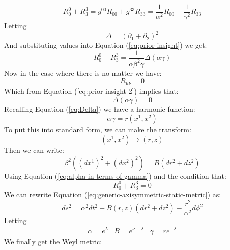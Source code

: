 \documentclass{article}
\begin{document}
\begin{equation}
R^{0}_{0}+R^{3}_{3}=g^{00}R_{00}+g^{33}R_{33}=\frac{1}{\alpha^{2}}R_{00}-\frac{1}{\gamma^{2}}R_{33}\label{eq:prior-insight}
\end{equation}
Letting
\begin{equation}
\Delta=\left(\partial_{1}+\partial_{2}\right)^{2}\label{eq:Delta}
\end{equation}
And substituting values into Equation (\ref{eq:prior-insight}) we get:
\begin{equation}
R^{0}_{0}+R^{3}_{3}=\frac{1}{\alpha\beta^{2}\gamma}\Delta\left(\alpha\gamma\right)\label{eq:prior-insight-2}
\end{equation}
Now in the case where there is no matter we have:
\begin{equation}
R_{\mu\nu}=0\label{eq:vacuum-solutions}
\end{equation}
Which from Equation (\ref{eq:prior-insight-2}) implies that:
\begin{equation}
\Delta\left(\alpha\gamma\right)=0
\end{equation}
Recalling Equation (\ref{eq:Delta}) we have a harmonic function:
\begin{equation}
\alpha\gamma=r\left(x^{1},x^{2}\right)\label{eq:alpha-in-terms-of-gamma}
\end{equation}
To put this into standard form, we can make the transform:
\begin{equation}
\left(x^{1},x^{2}\right)\rightarrow\left(r,z\right)
\end{equation}
Then we can write:
\begin{equation}
\beta^{2}\left(\left(dx^{1}\right)^{2}+\left(dx^{2}\right)^{2}\right)=B\left(dr^{2}+dz^{2}\right)
\end{equation} 
Using Equation (\ref{eq:alpha-in-terms-of-gamma}) and the condition that:
\begin{equation}
R^{0}_{0}+R^{3}_{3}=0
\end{equation}
We can rewrite Equation (\ref{eq:generic-axisymmetric-static-metric}) as:
\begin{equation}
ds^{2}=\alpha^{2}dt^{2}-B\left(r,z\right)\left(dr^{2}+dz^{2}\right)-\frac{r^{2}}{\alpha^{2}}d\phi^{2}
\end{equation}
Letting
\begin{equation}
\begin{array}{ccc}
\alpha=e^{\lambda} & B=e^{\nu-\lambda} & \gamma=re^{-\lambda}
\end{array}\label{eq:weyl-sustitutions}
\end{equation}
We finally get the Weyl metric:
\end{document}
